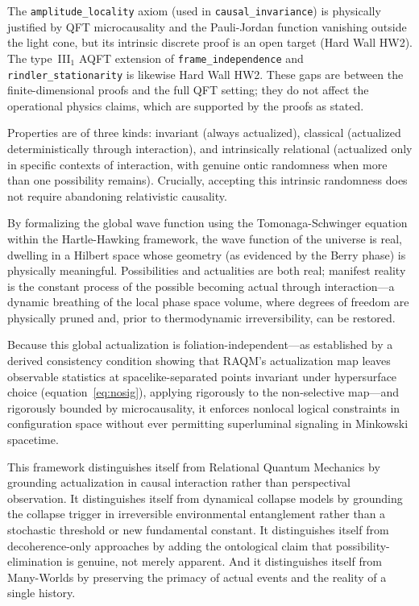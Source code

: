 \documentclass[11pt,a4paper]{article}
\theoremstyle{plain}
\theoremstyle{definition}
\theoremstyle{remark}
\begin{document}
\noindent
The \texttt{amplitude\_locality} axiom (used in \texttt{causal\_invariance})
is physically justified by QFT microcausality and the Pauli-Jordan function
vanishing outside the light cone, but its intrinsic discrete proof is an
open target (Hard Wall HW2). The type~III$_1$ AQFT extension of
\texttt{frame\_independence} and \texttt{rindler\_stationarity} is likewise
Hard Wall HW2. These gaps are between the finite-dimensional proofs and the
full QFT setting; they do not affect the operational physics claims, which
are supported by the proofs as stated.

Properties are of three kinds: invariant (always actualized), classical (actualized
deterministically through interaction), and intrinsically relational (actualized
only in specific contexts of interaction, with genuine ontic randomness when more
than one possibility remains). Crucially, accepting this intrinsic randomness does
not require abandoning relativistic causality.

By formalizing the global wave function using the Tomonaga-Schwinger equation
within the Hartle-Hawking framework, the wave function of the universe is real,
dwelling in a Hilbert space whose geometry (as evidenced by the Berry phase) is
physically meaningful. Possibilities and actualities are both real; manifest
reality is the constant process of the possible becoming actual through
interaction---a dynamic breathing of the local phase space volume, where degrees of
freedom are physically pruned and, prior to thermodynamic irreversibility, can be
restored.

Because this global actualization is foliation-independent---as established by a
derived consistency condition showing that RAQM's actualization map leaves
observable statistics at spacelike-separated points invariant under hypersurface
choice (equation~\ref{eq:nosig}), applying rigorously to the non-selective
map---and rigorously bounded by microcausality, it enforces nonlocal logical
constraints in configuration space without ever permitting superluminal signaling
in Minkowski spacetime.

This framework distinguishes itself from Relational Quantum Mechanics by grounding
actualization in causal interaction rather than perspectival observation. It
distinguishes itself from dynamical collapse models by grounding the collapse
trigger in irreversible environmental entanglement rather than a stochastic
threshold or new fundamental constant. It distinguishes itself from
decoherence-only approaches by adding the ontological claim that
possibility-elimination is genuine, not merely apparent. And it distinguishes
itself from Many-Worlds by preserving the primacy of actual events and the reality
of a single history.
\end{document}
